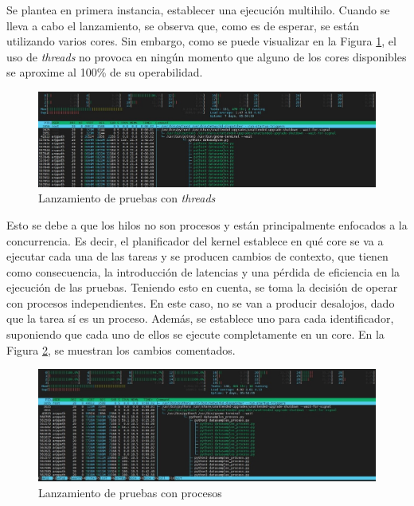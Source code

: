   


Se plantea en primera instancia, establecer una ejecución multihilo. Cuando se lleva a cabo el lanzamiento, se observa que, como es de esperar, se están utilizando varios cores. Sin embargo, como se puede visualizar en la Figura \ref{fig:multihilo}, el uso de \textit{threads} no provoca en ningún momento que alguno de los cores disponibles se aproxime al 100\% de su operabilidad.

\vspace{3mm}

\begin{figure}[h!]
  \centering
  \includegraphics[width=1\textwidth]{img/diseno/multihilo.jpg}
  \caption{Lanzamiento de pruebas con \textit{threads}}
  \label{fig:multihilo}
\end{figure}

\vspace{3mm}

Esto se debe a que los hilos no son procesos y están principalmente enfocados a la concurrencia. Es decir, el planificador del kernel establece en qué core se va a ejecutar cada una de las tareas y se producen cambios de contexto, que tienen como consecuencia, la introducción de latencias y una pérdida de eficiencia en la ejecución de las pruebas. Teniendo esto en cuenta, se toma la decisión de operar con procesos independientes. En este caso, no se van a producir desalojos, dado que la tarea sí es un proceso. Además, se establece uno para cada identificador, suponiendo que cada uno de ellos se ejecute completamente en un core. En la Figura \ref{fig:multiprocess}, se muestran los cambios comentados. \cite{thread}

\vspace{3mm}

\begin{figure}[H]
  \centering
  \includegraphics[width=1\textwidth]{img/diseno/multiprocess.jpg}
  \caption{Lanzamiento de pruebas con procesos}
  \label{fig:multiprocess}
\end{figure}

